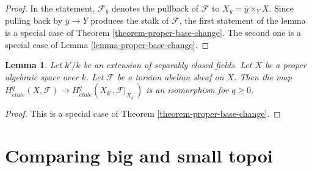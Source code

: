\documentclass{stacks-project}
\theoremstyle{plain}
\newtheorem{lemma}[subsection]{Lemma}
\theoremstyle{definition}
\theoremstyle{remark}
\numberwithin{equation}{subsection}
\def\etale{{\acute{e}tale}}
\begin{document}
\begin{proof}
In the statement, $\mathcal{F}_{\overline{y}}$ denotes the pullback
of $\mathcal{F}$ to $X_{\overline{y}} = \overline{y} \times_Y X$.
Since pulling back by $\overline{y} \to Y$ produces the
stalk of $\mathcal{F}$, the first statement of the lemma
is a special case of Theorem \ref{theorem-proper-base-change}.
The second one is a special case of Lemma \ref{lemma-proper-base-change}.
\end{proof}

\begin{lemma}
\label{lemma-base-change-separably-closed}
Let $k'/k$ be an extension of separably closed fields.
Let $X$ be a proper algebraic space over $k$.
Let $\mathcal{F}$ be a torsion abelian sheaf on $X$.
Then the map $H^q_\etale(X, \mathcal{F}) \to
H^q_\etale(X_{k'}, \mathcal{F}|_{X_{k'}})$ is an isomorphism
for $q \geq 0$.
\end{lemma}

\begin{proof}
This is a special case of Theorem \ref{theorem-proper-base-change}.
\end{proof}










\section{Comparing big and small topoi}
\label{section-compare}
\end{document}

